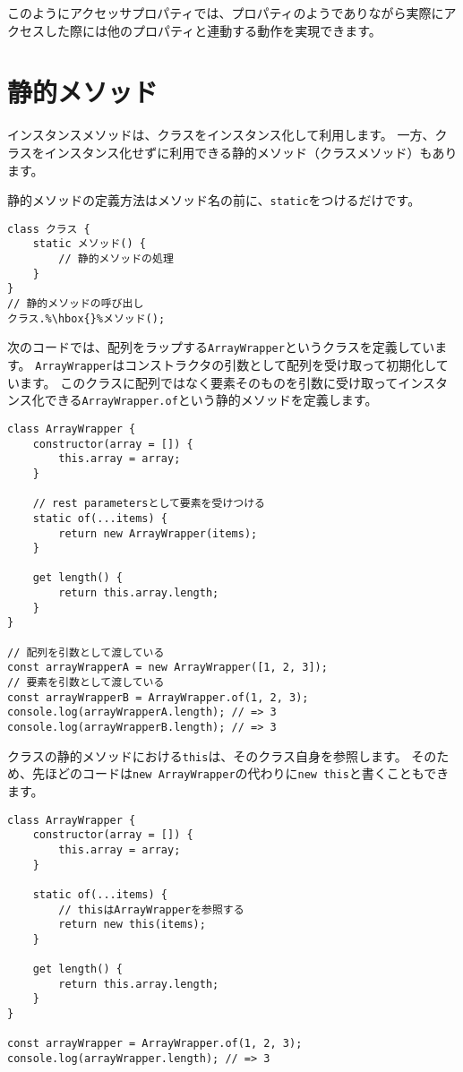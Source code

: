 このようにアクセッサプロパティでは、プロパティのようでありながら実際にアクセスした際には他のプロパティと連動する動作を実現できます。

\hypertarget{static-method}{%
\section{静的メソッド}\label{static-method}}

インスタンスメソッドは、クラスをインスタンス化して利用します。
一方、クラスをインスタンス化せずに利用できる静的メソッド（クラスメソッド）もあります。

静的メソッドの定義方法はメソッド名の前に、\texttt{static}をつけるだけです。

\begin{lstlisting}[escapechar=\%]
class クラス {
    static メソッド() {
        // 静的メソッドの処理
    }
}
// 静的メソッドの呼び出し
クラス.%\hbox{}%メソッド();
\end{lstlisting}

次のコードでは、配列をラップする\texttt{ArrayWrapper}というクラスを定義しています。
\texttt{ArrayWrapper}はコンストラクタの引数として配列を受け取って初期化しています。
このクラスに配列ではなく要素そのものを引数に受け取ってインスタンス化できる\texttt{ArrayWrapper.of}という静的メソッドを定義します。

\begin{lstlisting}
class ArrayWrapper {
    constructor(array = []) {
        this.array = array;
    }

    // rest parametersとして要素を受けつける
    static of(...items) {
        return new ArrayWrapper(items);
    }

    get length() {
        return this.array.length;
    }
}

// 配列を引数として渡している
const arrayWrapperA = new ArrayWrapper([1, 2, 3]);
// 要素を引数として渡している
const arrayWrapperB = ArrayWrapper.of(1, 2, 3);
console.log(arrayWrapperA.length); // => 3
console.log(arrayWrapperB.length); // => 3
\end{lstlisting}

クラスの静的メソッドにおける\texttt{this}は、そのクラス自身を参照します。
そのため、先ほどのコードは\texttt{new ArrayWrapper}の代わりに\texttt{new this}と書くこともできます。

\begin{lstlisting}
class ArrayWrapper {
    constructor(array = []) {
        this.array = array;
    }

    static of(...items) {
        // thisはArrayWrapperを参照する
        return new this(items);
    }

    get length() {
        return this.array.length;
    }
}

const arrayWrapper = ArrayWrapper.of(1, 2, 3);
console.log(arrayWrapper.length); // => 3
\end{lstlisting}

